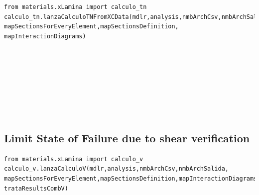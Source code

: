  
\begin{verbatim}
from materials.xLamina import calculo_tn
calculo_tn.lanzaCalculoTNFromXCData(mdlr,analysis,nmbArchCsv,nmbArchSalida, 
mapSectionsForEveryElement,mapSectionsDefinition, mapInteractionDiagrams)
\end{verbatim}
\begin{paramFuncTable}
\mdlr{} \\
\analysis{} \\
\\
\nmbArchSalida{}\\
\mapSectionsForEveryElement{} \\
\mapSectionsDefinition{} \\
\mapInteractionDiagrams{} \\
\end{paramFuncTable}


\subsection{Limit State of Failure due to shear verification}
\begin{verbatim}
from materials.xLamina import calculo_v
calculo_v.lanzaCalculoV(mdlr,analysis,nmbArchCsv,nmbArchSalida, 
mapSectionsForEveryElement,mapSectionsDefinition,mapInteractionDiagrams,
trataResultsCombV)
\end{verbatim}

\begin{paramFuncTable}
\mdlr{} \\
\analysis{} \\
\\
\nmbArchSalida{}\\
\mapSectionsForEveryElement{} \\
\mapSectionsDefinition{} \\
\mapInteractionDiagrams{} \\
\trataResultsCombV{} \\
\end{paramFuncTable}


